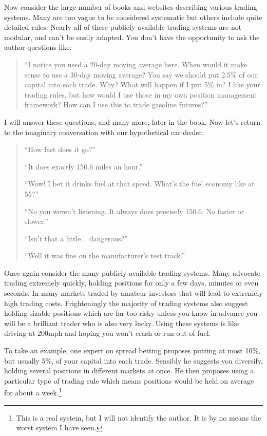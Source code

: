 Now consider the large number of books and websites describing various trading systems. Many are too vague to be considered systematic but others include quite detailed rules. Nearly all of these publicly available trading systems are not modular, and can't be easily adapted. You don't have the opportunity to ask the author questions like:

\begin{quote}
``I notice you used a 20-day moving average here. When would it make sense to use a 30-day moving average? You say we should put 2.5\% of our capital into each trade. Why? What will happen if I put 5\% in? I like your trading rules, but how would I use those in my own position management framework? How can I use this to trade gasoline futures?''
\end{quote}

I will answer these questions, and many more, later in the book. Now let's return to the imaginary conversation with our hypothetical car dealer.

\begin{quote}
``How fast does it go?'' 

``It does exactly 150.6 miles an hour.'' 

``Wow! I bet it drinks fuel at that speed. What's the fuel economy like at 55?'' 

``No you weren't listening. It always does precisely 150.6. No faster or slower.'' 

``Isn't that a little... dangerous?'' 

``Well it was fine on the manufacturer's test track.''
\end{quote}

Once again consider the many publicly available trading systems. Many advocate trading extremely quickly, holding positions for only a few days, minutes or even seconds. In many markets traded by amateur investors that will lead to extremely high trading costs. Frighteningly the majority of trading systems also suggest holding sizable positions which are far too risky unless you know in advance you will be a brilliant trader who is also very lucky. Using these systems is like driving at 200mph and hoping you won't crash or run out of fuel.

To take an example, one expert on spread betting proposes putting at most 10\%, but usually 5\%, of your capital into each trade. Sensibly he suggests you diversify, holding several positions in different markets at once. He then proposes using a particular type of trading rule which means positions would be held on average for about a week.\footnote{This is a real system, but I will not identify the author. It is by no means the worst system I have seen.}

